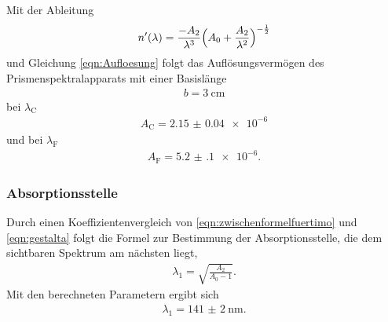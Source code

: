 Mit der Ableitung
\begin{align}
  n'(\lambda) = \frac{-A_2}{\lambda^3}\Bigl(A_0 + \frac{A_2}{\lambda^2}\Bigr)^{-\frac{1}{2}}
\end{align}
und Gleichung \eqref{eqn:Aufloesung} folgt das Auflösungsvermögen des
Prismenspektralapparats mit einer Basislänge
\begin{align}
  b = \SI{3}{\centi\meter}
\end{align}
bei $\lambda_\text{C}$
\begin{align}
  A_\text{C} = \num{2.15(4)e-6}
\end{align}
und bei $\lambda_\text{F}$
\begin{align}
  A_\text{F} = \num{5.2(1)e-6}.
\end{align}

\subsubsection{Absorptionsstelle}

Durch einen Koeffizientenvergleich von \eqref{eqn:zwischenformelfuertimo} und
\eqref{eqn:gestalta}
folgt die Formel zur Bestimmung der Absorptionsstelle, die
dem sichtbaren Spektrum am nächsten liegt,
\begin{align}
  \lambda_1 = \sqrt{\frac{A_2}{A_0 - 1}}.
\end{align}
Mit den berechneten Parametern ergibt sich
\begin{align}
  \lambda_1 = \SI{141(2)}{\nano\meter}.
\end{align}
